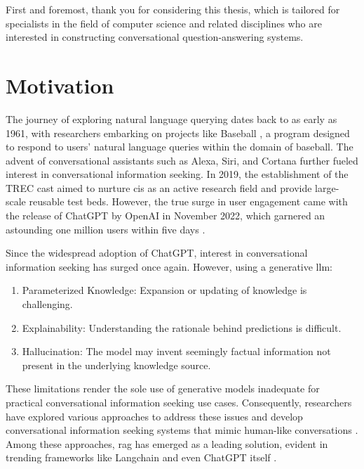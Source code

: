 First and foremost, thank you for considering this thesis, which is tailored for specialists in the field of computer science and related disciplines who are interested in constructing conversational question-answering systems.

\section{Motivation}

The journey of exploring natural language querying dates back to as early as 1961, with researchers embarking on projects like Baseball \cite{green_baseball_1961}, a program designed to respond to users' natural language queries within the domain of baseball. The advent of conversational assistants such as Alexa, Siri, and Cortana further fueled interest in conversational information seeking. In 2019, the establishment of the TREC \gls{cast} aimed to nurture \gls{cis} as an active research field and provide large-scale reusable test beds. However, the true surge in user engagement came with the release of ChatGPT by OpenAI in November 2022, which garnered an astounding one million users within five days \cite{demandsage2022chatgpt}.

Since the widespread adoption of ChatGPT, interest in conversational information seeking has surged once again. However, using a generative \gls{llm}:

\begin{enumerate}
    \item Parameterized Knowledge: Expansion or updating of knowledge is challenging.
    \item Explainability: Understanding the rationale behind predictions is difficult.
    \item Hallucination: The model may invent seemingly factual information not present in the underlying knowledge source.
\end{enumerate}

These limitations render the sole use of generative models inadequate for practical conversational information seeking use cases. Consequently, researchers have explored various approaches to address these issues and develop conversational information seeking systems that mimic human-like conversations \cite{ferrucci_introduction_2012,guu_realm_2020,lewis_retrieval-augmented_2021,nakano_webgpt_2022}. Among these approaches, \gls{rag} \cite{lewis_retrieval-augmented_2021} has emerged as a leading solution, evident in trending frameworks like Langchain \cite{noauthor_question_nodate} and even ChatGPT itself \cite{noauthor_chatgpt_2023}.

